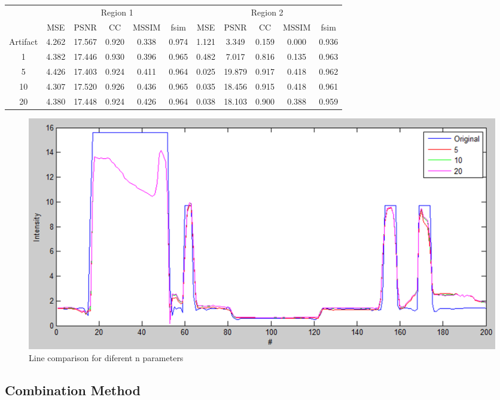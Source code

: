 \begin{adjustwidth}{-1in}{-1in}
\centering
\begin{tabular}{c|c|c|c|c|c|c|c|c|c|c|}
\cline{2-11}
& \multicolumn{5}{|c|}{Region 1} & \multicolumn{5}{|c|}{Region 2} \\
\cline{2-11}
& MSE & PSNR & CC & MSSIM & fsim  & MSE & PSNR & CC & MSSIM & fsim  \\
\hline
\multicolumn{1}{|c|}{Artifact} & 4.262	& 17.567 &0.920	&0.338	&0.974	&1.121	&3.349	&0.159	&0.000	&0.936 \\
\multicolumn{1}{|c|}{1} &4.382	&17.446	&0.930	&0.396	&0.965	&0.482	&7.017	&0.816	&0.135	&0.963 \\
\multicolumn{1}{|c|}{5} &4.426	&17.403	&0.924	&0.411	&0.964	&0.025	&19.879	&0.917	&0.418	&0.962 \\
\multicolumn{1}{|c|}{10} &4.307	&17.520	&0.926	&0.436	&0.965	&0.035	&18.456	&0.915	&0.418	&0.961 \\
\multicolumn{1}{|c|}{20} &4.380	&17.448	&0.924	&0.426	&0.964	&0.038	&18.103	&0.900	&0.388	&0.959 \\
\hline
\end{tabular}
\end{adjustwidth}
\medskip

\begin{figure}[H]
\centering	
\includegraphics[scale=0.6]{img/n_line}
\caption{{Line comparison for diferent n parameters}}\label{n_line}
\end{figure}

\subsection{Combination Method}

